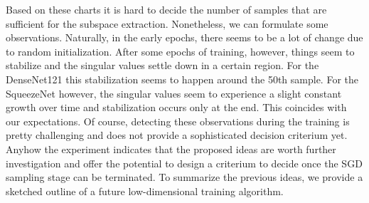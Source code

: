 \documentclass[11pt, a4paper]{article}
\begin{document}
Based on these charts it is hard to decide the number of samples that are sufficient for the subspace extraction. Nonetheless, we can formulate some observations. Naturally, in the early epochs, there seems to be a lot of change due to random initialization. After some epochs of training, however, things seem to stabilize and the singular values settle down in a certain region. For the DenseNet121 this stabilization seems to happen around the 50th sample. For the SqueezeNet however, the singular values seem to experience a slight constant growth over time and stabilization occurs only at the end. This coincides with our expectations. Of course, detecting these observations during the training is pretty challenging and does not provide a sophisticated decision criterium yet. Anyhow the experiment indicates that the proposed ideas are worth further investigation and offer the potential to design a criterium to decide once the SGD sampling stage can be terminated. To summarize the previous ideas, we provide a sketched outline of a future low-dimensional training algorithm.
\end{document}
